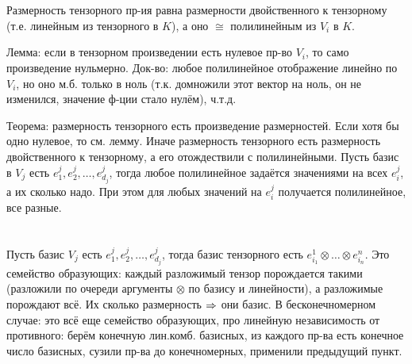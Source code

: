 \section{} %
Размерность тензорного пр-ия равна размерности двойственного к тензорному (т.е. линейным из тензорного в $K$),
а оно $\cong$ полилинейным из $V_i$ в $K$.

Лемма: если в тензорном произведении есть нулевое пр-во $V_i$, то само произведение нульмерно.
Док-во: любое полилинейное отображение линейно по $V_i$, но оно м.б. только в ноль (т.к. домножили этот вектор на ноль,
он не изменился, значение ф-ции стало нулём), ч.т.д.

Теорема: размерность тензорного есть произведение размерностей.
Если хотя бы одно нулевое, то см. лемму.
Иначе размерность тензорного есть размерность двойственного к тензорному, а его отождествили с полилинейными.
Пусть базис в $V_j$ есть $e_1^j, e_2^j, \dots, e_{d_j}^j$, тогда любое полилинейное
задаётся значениями на всех $e_i^j$, а их сколько надо.
При этом для любых значений на $e_i^j$ получается полилинейное, все разные.

\section{} %
Пусть базис $V_j$ есть $e_1^j, e_2^j, \dots, e_{d_j}^j$,
тогда базис тензорного есть $e_{i_1}^1 \otimes \dots \otimes e_{i_n}^n$.
Это семейство образующих: каждый разложимый тензор порождается такими (разложили по очереди аргументы $\otimes$ по базису и линейности),
а разложимые порождают всё.
Их сколько размерность $\Rightarrow$ они базис.
В бесконечномерном случае: это всё еще семейство образующих, про линейную независимость от противного: берём конечную лин.комб.
базисных, из каждого пр-ва есть конечное число базисных, сузили пр-ва до конечномерных, применили предыдущий пункт.
